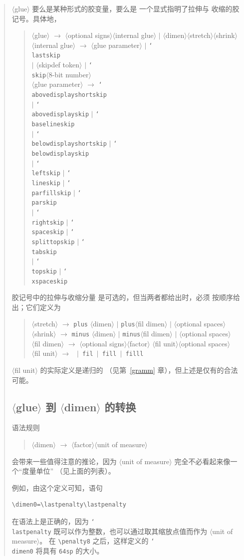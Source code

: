 \documentclass[a4paper]{rapport3}
\def\nl{\protect\\}\def\n#1{{\tt #1}}\def\cs#1{{\tt\char`\\#1}}\let\csc\cs
\def\gr#1{$\langle$#1$\rangle$}\def\key#1{{\tt#1}}
\newenvironment{disp}{\begin{quotation}}{\end{quotation}}
\begin{document}
\begin{disp}
\gr{glue} 要么是某种形式的胶变量，要么是
一个显式指明了拉伸与
收缩的胶记号。具体地，
\begin{disp}\gr{glue} $\longrightarrow$ \gr{optional signs}\gr{internal glue}
     $|$ \gr{dimen}\gr{stretch}\gr{shrink}\nl
     \gr{internal glue} $\longrightarrow$ \gr{glue parameter}
     $|$ \cs{lastskip}\nl 
     \indent $|$ \gr{skipdef token} $|$ \cs{skip}\gr{8-bit number}\nl
     \gr{glue parameter} $\longrightarrow$ \cs{abovedisplayshortskip}\nl
     \indent $|$ \cs{abovedisplayskip} $|$ \cs{baselineskip}\nl
     \indent $|$ \cs{belowdisplayshortskip} $|$ \cs{belowdisplayskip}\nl
     \indent $|$ \cs{leftskip} $|$ \cs{lineskip} $|$ \cs{parfillskip}
             $|$ \cs{parskip}\nl
     \indent $|$ \cs{rightskip} $|$ \cs{spaceskip}
             $|$ \cs{splittopskip} $|$ \cs{tabskip}\nl
     \indent $|$ \cs{topskip} $|$ \cs{xspaceskip}
\end{disp}
胶记号中的拉伸与收缩分量
是可选的，但当两者都给出时，必须
按顺序给出；它们定义为
\begin{disp}
\gr{stretch} $\longrightarrow$ \n{plus} \gr{dimen}
      $|$ \n{plus}\gr{fil dimen} $|$ \gr{optional spaces}\nl
\gr{shrink} $\longrightarrow$ \n{minus} \gr{dimen}
      $|$ \n{minus}\gr{fil dimen} $|$ \gr{optional spaces}\nl
\gr{fil dimen} $\longrightarrow$ \gr{optional signs}\gr{factor}%
     \gr{fil unit}\gr{optional spaces}\nl
\gr{fil unit} $\longrightarrow$ \n{ $|$ fil $|$ fill $|$ filll}
\end{disp}

\gr{fil unit} 的实际定义是递归的
（见第~\ref{gramm} 章），但上述是仅有的合法
可能。

\subsection{\gr{glue} 到 \gr{dimen} 的转换}

语法规则
\begin{disp}\gr{dimen} $\longrightarrow$
     \gr{factor}\gr{unit of measure}
\end{disp}
会带来一些值得注意的推论，因为
\gr{unit of measure} 完全不必看起来像一个“度量单位”
（见上面的列表）。

例如，由这个定义可知，语句
\begin{verbatim}
\dimen0=\lastpenalty\lastpenalty
\end{verbatim}
在语法上是正确的，因为 \cs{lastpenalty}
既可以作为整数，也可以通过取其缩放点值而作为 \gr{unit of measure}。
在 \verb>\penalty8> 之后，这样定义的 \cs{dimen0}
将具有 \n{64sp} 的大小。


\end{disp}
\end{document}
